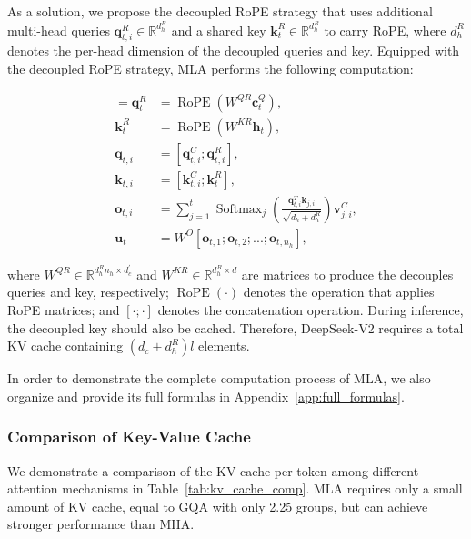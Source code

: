 As a solution, we propose the decoupled RoPE strategy that uses additional multi-head queries $\mathbf{q}_{t, i}^{R} \in \mathbb{R}^{d_h^R}$ and a shared key $\mathbf{k}_{t}^{R} \in \mathbb{R}^{d_h^R}$ to carry RoPE, where $d_h^R$ denotes the per-head dimension of the decoupled queries and key. Equipped with the decoupled RoPE strategy, MLA performs the following computation:

\begin{align}
    [\mathbf{q}_{t, 1}^{R};\mathbf{q}_{t, 2}^{R};...;\mathbf{q}_{t, n_{h}}^{R}] = \mathbf{q}_{t}^{R} &= \operatorname{RoPE}({W^{QR}} \mathbf{c}_{t}^{Q}), \\
    \mathbf{k}_{t}^{R} &= \operatorname{RoPE}({W^{KR}} \mathbf{h}_{t}), \\
    \mathbf{q}_{t, i} &= [\mathbf{q}_{t, i}^{C}; \mathbf{q}_{t, i}^{R}], \\
    \mathbf{k}_{t, i} &= [\mathbf{k}_{t, i}^{C}; \mathbf{k}_{t}^{R}], \\
    \mathbf{o}_{t, i} &= \sum_{j=1}^{t} \operatorname{Softmax}_j(\frac{\mathbf{q}_{t, i}^T \mathbf{k}_{j, i}}{\sqrt{d_{h} + d_{h}^{R}}}) \mathbf{v}_{j, i}^{C}, \\ 
    \mathbf{u}_{t} &= W^{O} [\mathbf{o}_{t, 1};\mathbf{o}_{t, 2};...;\mathbf{o}_{t, n_{h}}],
\end{align}

where $W^{QR} \in \mathbb{R}^{d_h^R n_h \times d_c^{\prime}}$ and $W^{KR} \in \mathbb{R}^{d_h^R \times d}$ are matrices to produce the decouples queries and key, respectively; 
$\operatorname{RoPE}(\cdot)$ denotes the operation that applies RoPE matrices; and $[\cdot;\cdot]$ denotes the concatenation operation. During inference, the decoupled key should also be cached. Therefore, DeepSeek-V2 requires a total KV cache containing $(d_{c} + d_h^R)l$ elements. 

In order to demonstrate the complete computation process of MLA, we also organize and provide its full formulas in Appendix~\ref{app:full_formulas}. 

\subsubsection{Comparison of Key-Value Cache}

We demonstrate a comparison of the KV cache per token among different attention mechanisms in Table~\ref{tab:kv_cache_comp}. 
MLA requires only a small amount of KV cache, equal to GQA with only 2.25 groups, but can achieve stronger performance than MHA. 


